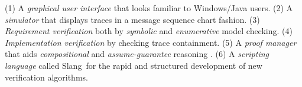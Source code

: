 \documentclass[10pt,twocolumn]{article}
\def\jmocha{{\small\sc jMocha}}
\def\cmocha{{\small\sc cMocha}}
\def\slang{{\small\sc Slang}}
\begin{document}
%
%
(1) A \emph{ graphical user interface} that looks
  familiar to Windows/Java users.
(2) A \emph{simulator} that displays
traces in a message sequence chart fashion. 
(3) {\em Requirement verification} both by \emph{symbolic} and \emph{enumerative} 
model checking. 
(4) \emph{Implementation verification} by checking trace containment.
(5) A \emph{proof manager} that aids \emph{compositional} and \emph{assume-guarantee}
reasoning \cite{HQR98}.
(6) A \emph{scripting language} called \slang\ for the rapid and structured
development of new verification algorithms.
\end{document}

